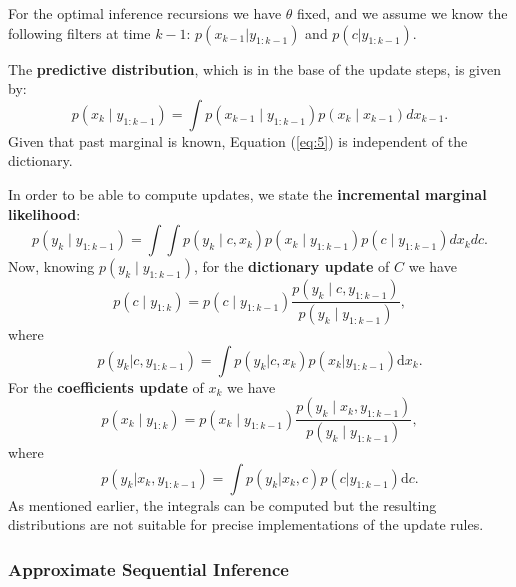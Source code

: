 \documentclass{mldsmsc}
\begin{document}
For the optimal inference recursions we have $\theta$ fixed, and we assume we know the following filters at time $k - 1$: $p(x_{k-1}|y_{1:k-1})$ and $p(c|y_{1:k-1})$. \newline

\noindent The \textbf{predictive distribution}, which is in the base of the update steps, is given by:
\begin{equation} \label{eq:5}
    p(x_k \mid y_{1:k-1}) = \int p(x_{k-1} \mid y_{1:k-1}) p(x_k \mid x_{k-1}) dx_{k-1}.
\end{equation}
Given that past marginal is known, Equation (\ref{eq:5}) is independent of the dictionary. \newline

\noindent In order to be able to compute updates, we state the \textbf{incremental marginal likelihood}:
\begin{equation}
    p(y_k \mid y_{1:k-1}) = \int \int p(y_k \mid c, x_k) p(x_k \mid y_{1:k-1}) p(c \mid y_{1:k-1}) dx_k dc.
\end{equation}
Now, knowing $p(y_k \mid y_{1:k-1})$, for the \textbf{dictionary update} of $C$ we have
\begin{equation}
    p(c \mid y_{1:k}) = p(c \mid y_{1:k-1}) \frac{p(y_k \mid c, y_{1:k-1})}{p(y_k \mid y_{1:k-1})},
\end{equation}
where
\begin{equation} \label{eq:14}
    p(y_k | c, y_{1:k-1}) = \int p(y_k | c, x_k) p(x_k | y_{1:k-1}) \text{d}x_k.
\end{equation}
For the \textbf{coefficients update} of $x_k$ we have
\begin{equation}\label{eq:15}
    p(x_k \mid y_{1:k}) = p(x_k \mid y_{1:k-1})  \frac{p(y_k \mid x_k, y_{1:k-1})}{p(y_k \mid y_{1:k-1})},
\end{equation}
where
\begin{equation}
    p(y_k | x_k, y_{1:k-1}) = \int p(y_k | x_k, c) p(c | y_{1:k-1})\text{d}c.
\end{equation}
As mentioned earlier, the integrals can be computed but the resulting distributions are not suitable for precise implementations of the update rules.

\subsubsection{Approximate Sequential Inference}
\end{document}
